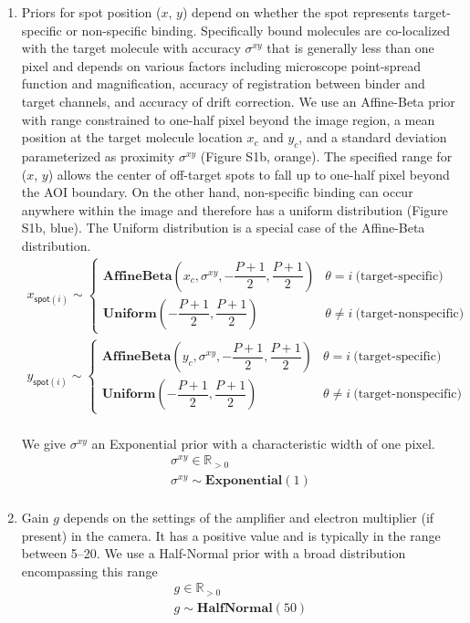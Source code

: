 \begin{enumerate}
\item Priors for spot position ($x$, $y$) depend on whether the spot represents target-specific or non-specific binding. Specifically bound molecules are co-localized with the target molecule with accuracy $\sigma^{xy}$ that is generally less than one pixel and depends on various factors including microscope point-spread function and magnification, accuracy of registration between binder and target channels, and accuracy of drift correction. We use an Affine-Beta prior with range constrained to one-half pixel beyond the image region, a mean position at the target molecule location $x_c$ and $y_c$, and a standard deviation parameterized as proximity $\sigma^{xy}$ (Figure S1b, orange). The specified range for ($x$, $y$) allows the center of off-target spots to fall up to one-half pixel beyond the AOI boundary. On the other hand, non-specific binding can occur anywhere within the image and therefore has a uniform distribution (Figure S1b, blue). The Uniform distribution is a special case of the Affine-Beta distribution.
%
\begin{gather*}
    x_{\mathsf{spot}(i)} \sim
    \begin{cases}
        \mathbf{AffineBeta}\left( x_c, \sigma^{xy}, -\dfrac{P+1}{2}, \dfrac{P+1}{2} \right) & \theta = i ~\textrm{(target-specific)} \\
        \mathbf{Uniform}\left(-\dfrac{P+1}{2}, \dfrac{P+1}{2} \right) & \theta \neq i ~\text{(target-nonspecific)}
    \end{cases} \\
    y_{\mathsf{spot}(i)} \sim
    \begin{cases}
        \mathbf{AffineBeta}\left( y_c, \sigma^{xy}, -\dfrac{P+1}{2}, \dfrac{P+1}{2} \right) & \theta = i ~\textrm{(target-specific)} \\
        \mathbf{Uniform}\left(-\dfrac{P+1}{2}, \dfrac{P+1}{2} \right) & \theta \neq i ~\text{(target-nonspecific)}
    \end{cases} \\
\end{gather*}

We give $\sigma^{xy}$ an Exponential prior with a characteristic width of one pixel.
%
\begin{gather*}
    \sigma^{xy} \in \mathbb{R}_{>0} \\
    \sigma^{xy} \sim \mathbf{Exponential}(1) \\
\end{gather*}

\item Gain $g$ depends on the settings of the amplifier and electron multiplier (if present) in the camera. It has a positive value and is typically in the range between 5--20. We use a Half-Normal prior with a broad distribution encompassing this range
%
\begin{gather*}
    g \in \mathbb{R}_{>0} \\
    g \sim \mathbf{HalfNormal}(50)
\end{gather*}


\end{enumerate}

